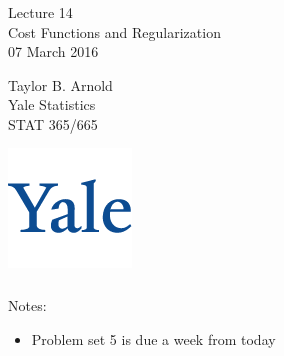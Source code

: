 \documentclass[xetex,mathserif,serif,aspectratio=169]{beamer}
\begin{document}
\begin{frame}[fragile] \frametitle{} \oldB \small

\vfill

{\fontsize{0.7cm}{0cm}\selectfont Lecture 14 \\\vspace{0.2cm} Cost Functions
and Regularization}\\\vspace{0.5cm}
07 March 2016

\vspace{2cm}

\begin{minipage}{0.6\textwidth}
Taylor B. Arnold \\
Yale Statistics \\
STAT 365/665
\end{minipage}
\hfill
\begin{minipage}{0.3\textwidth}\raggedleft
\includegraphics[scale=0.3]{../yale-logo.png}
\end{minipage}%

\end{frame}

\begin{frame}[fragile] \frametitle{} \oldB \small

Notes:
\begin{itemize}
\item Problem set 5 is due a week from today
\end{itemize}

\end{frame}
\end{document}
